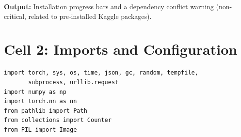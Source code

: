 \documentclass[a4paper, 12pt]{article}
\begin{document}
\textbf{Output:} Installation progress bars and a dependency conflict warning (non-critical, related to pre-installed Kaggle packages).

\newpage
\section{Cell 2: Imports and Configuration}

\begin{lstlisting}
import torch, sys, os, time, json, gc, random, tempfile,
       subprocess, urllib.request
import numpy as np
import torch.nn as nn
from pathlib import Path
from collections import Counter
from PIL import Image
\end{lstlisting}
\end{document}

